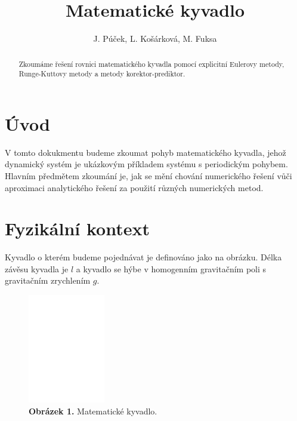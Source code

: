 \documentclass[reqno, a4paper]{amsart}
\author{J. Púček, L. Košárková, M. Fuksa}
\title{Matematické kyvadlo}
\begin{document}
	
	\begin{abstract}
		Zkoumáme řešení rovnici matematického kyvadla pomocí explicitní Eulerovy metody, Runge-Kuttovy metody a metody korektor-prediktor.
	\end{abstract}
	
	\maketitle
	
		\tableofcontents
		
		\section{Úvod}
		\label{sec:Úvod}
		
		V tomto dokukmentu budeme zkoumat pohyb matematického kyvadla, jehož dynamický systém je ukázkovým příkladem systému s periodickým pohybem. Hlavním předmětem zkoumání je, jak se mění chování numerického řešení vůči aproximaci analytického řešení za použití různých numerických metod.
		
		\section{Fyzikální kontext}
		\label{sec:Fyzikální kontext}
		Kyvadlo o kterém budeme pojednávat je definováno jako na obrázku. Délka závěsu kyvadla je $l$ a kyvadlo se hýbe v homogenním gravitačním poli s gravitačním zrychlením $g$.
		
		\begin{figure}[h]
			\centering
			\includegraphics[width=0.3\textwidth]{pendulum-intro}
			\caption*{\textbf{Obrázek 1.} Matematické kyvadlo.}  
			\label{fig:pendulum-intro}
		\end{figure}
		
\end{document}
